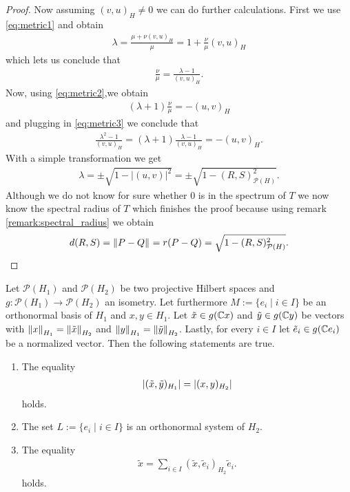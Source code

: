 \begin{proof}
	Now assuming $(v,u)_H \neq 0$ we can do further calculations. First we use \eqref{eq:metric1} and obtain
	\begin{align*}
		\lambda = \frac{\mu + \nu (v,u)_H}{\mu} = 1 + \frac{\nu}{\mu} (v,u)_H 
	\end{align*}
	which lets us conclude that 
	\begin{align}
		\frac{\nu}{\mu} = \frac{\lambda - 1}{(v,u)_H}. \label{eq:metric3}
	\end{align}
	Now, using \eqref{eq:metric2},we obtain
	\begin{align*}
		 (\lambda + 1) \frac{\nu}{\mu} =  -(u,v)_H 
	\end{align*}
	and plugging in \eqref{eq:metric3} we conclude that
	\begin{align*}
			\frac{\lambda^2 - 1}{(v,u)_H} = (\lambda + 1) \frac{\lambda - 1}{(v,u)_H} =  - (u,v)_H.
	\end{align*}
	With a simple transformation we get
	\begin{align*}
		\lambda = \pm \sqrt{1 - |(u,v)|^2} = \pm \sqrt{1 - (R,S)_{\mathcal{P}(H)}^2}.
	\end{align*}
	Although we do not know for sure whether $0$ is in the spectrum of $T$ we now know the spectral radius of $T$ which finishes the proof because using remark \ref{remark:spectral_radius} we obtain
	\begin{align*}
		d(R,S) = \norm{P - Q} = r(P - Q) = \sqrt{1 - (R,S)_{\mathcal{P}(H)}^2}.
	\end{align*}
\end{proof}


\begin{lemma}
	Let $\mathcal{P}(H_1)$ and $\mathcal{P}(H_2)$ be two projective Hilbert spaces and $g: \mathcal{P}(H_1) \to \mathcal{P}(H_2)$ an isometry. Let furthermore $M := \{e_i \mid i \in I\}$ be an orthonormal basis of $H_1$ and $x,y \in H_1 $. Let $\tilde{x} \in g(\C x)$ and $\tilde{y} \in g(\C y)$  be vectors with $\norm[H_1]{x} = \norm[H_2]{\tilde{x}}$ and $\norm[H_1]{y} = \norm[H_2]{\tilde{y}}$. Lastly, for every $i \in I$ let $\tilde{e}_i \in g(\C e_i)$ be a normalized vector. Then the  following statements are true.
	
	\begin{enumerate}
		\item The equality
		\begin{align} 
			\vbraces{(\tilde{x}, \tilde{y})_{H_1}} = \vbraces{(x, y)_{H_2}} \label{eq:vector_isometry}
		\end{align}
		holds.		
		
		\item The set $L:=\{e_i \mid i \in I\}$ is an orthonormal system of $H_2$. \label{bullet:ran_ons}
		
		\item The equality
		\begin{align}
			\tilde{x} = \sum_{i \in I} (\tilde{x}, \tilde{e}_i)_{H_2} \tilde{e}_i. \label{eq:ran_fourier}
		\end{align}
		holds.
		
	\end{enumerate} 
\end{lemma}

